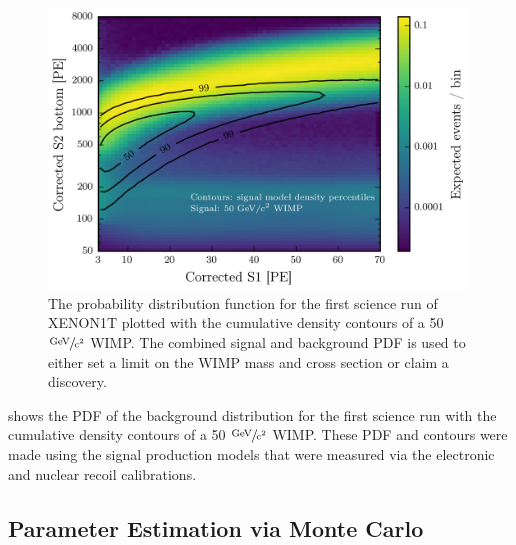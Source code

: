 \begin{figure}
        \centering
	\includegraphics[width=0.99\textwidth]{xe1t_background_pdf}
	\caption{The probability distribution function for the first science run of XENON1T plotted with the cumulative density contours of a 50 $\sfrac{\textrm{GeV}}{\textrm{c}^2}$ WIMP.  The combined signal and  background PDF is used to either set a limit on the WIMP mass and cross section or claim a discovery.}
	\label{fig:xe1t_background_pdf}
\end{figure}

 shows the PDF of the background distribution for the first science run with the cumulative density contours of a 50 $\sfrac{\textrm{GeV}}{\textrm{c}^2}$ WIMP.  These PDF and contours were made using the signal production models that were measured via the electronic and nuclear recoil calibrations.



\subsection{Parameter Estimation via Monte Carlo}


